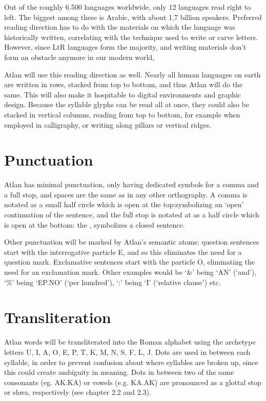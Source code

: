 Out of the roughly 6.500 languages worldwide, only 12 languages read right to left. The biggest among these is Arabic, with about 1,7 billion speakers. Preferred reading direction has to do with the materials on which the language was historically written, correlating with the technique used to write or carve letters. However, since LtR languages form the majority, and writing materials don’t form an obstacle anymore in our modern world, 

Atlan will use this reading direction as well. Nearly all human languages on earth are written in rows, stacked from top to bottom, and thus Atlan will do the same. This will also make it hospitable to digital environments and graphic design. Because the syllable glyphs can be read all at once, they could also be stacked in vertical columns, reading from top to bottom, for example when employed in calligraphy, or writing along pillars or vertical ridges. 
\vfill

\section{Punctuation}
Atlan has minimal punctuation, only having dedicated symbols for a comma and a full stop, and spaces are the same as in any other orthography. A comma is notated as a small half circle which is open at the top:\comma symbolizing an ‘open’ continuation of the sentence, and the full stop is notated at as a half circle which is open at the bottom: the \period , symbolizes a closed sentence. 

Other punctuation will be marked by Atlan’s semantic atoms: question sentences start with the interrogative particle E, and so this eliminates the need for a question mark. Exclamative sentences start with the particle O, eliminating the need for an exclamation mark. Other examples would be ‘\&’ being ‘AN’ (‘and’), ‘\%’ being ‘EP.NO’ (‘per hundred’), ‘:’ being ‘I’ (‘relative clause’) etc. 

\section{Transliteration}
Atlan words will be transliterated into the Roman alphabet using the archetype letters U, I, A, O, E, P, T, K, M, N, S, F, L, J. Dots are used in between each syllable, in order to prevent confusion about where syllables are broken up, since this could create ambiguity in meaning. Dots in between two of the same consonants (eg. AK.KA) or vowels (e.g. KA.AK) are pronounced as a glottal stop or shwa, respectively (see chapter 2.2 and 2.3). 

